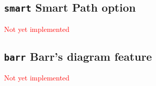 \documentclass{article}
\def\NotYet#1{\textcolor{red}{#1}}
\begin{document}
\subsection{\texttt{smart} Smart Path option}
\NotYet{Not yet implemented}

\subsection{\texttt{barr} Barr's diagram feature}
\NotYet{Not yet implemented}
\end{document}
